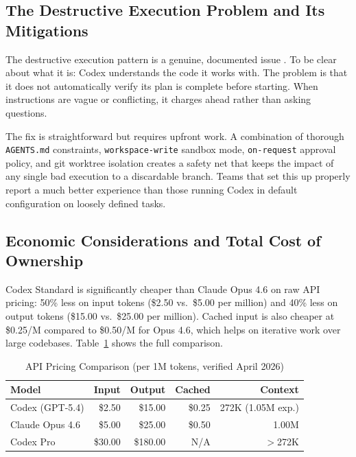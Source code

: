 \documentclass[conference]{IEEEtran}
\begin{document}
\subsection{The Destructive Execution Problem and Its Mitigations}
The destructive execution pattern is a genuine, documented issue \cite{wiegold2026, reddit2026}. To be clear about what it is: Codex understands the code it works with. The problem is that it does not automatically verify its plan is complete before starting. When instructions are vague or conflicting, it charges ahead rather than asking questions.

The fix is straightforward but requires upfront work. A combination of thorough \texttt{AGENTS.md} constraints, \texttt{workspace-write} sandbox mode, \texttt{on-request} approval policy, and git worktree isolation creates a safety net that keeps the impact of any single bad execution to a discardable branch. Teams that set this up properly report a much better experience than those running Codex in default configuration on loosely defined tasks.

\subsection{Economic Considerations and Total Cost of Ownership}
Codex Standard is significantly cheaper than Claude Opus 4.6 on raw API pricing: 50\% less on input tokens (\$2.50 vs.\ \$5.00 per million) and 40\% less on output tokens (\$15.00 vs.\ \$25.00 per million). Cached input is also cheaper at \$0.25/M compared to \$0.50/M for Opus 4.6, which helps on iterative work over large codebases. Table~\ref{tab:pricing} shows the full comparison.

\begin{table}[!htbp]
\caption{API Pricing Comparison (per 1M tokens, verified April 2026)}
\label{tab:pricing}
\centering
\small
\setlength{\tabcolsep}{3pt}
\begin{tabular}{@{}lrrrr@{}}
\toprule
\textbf{Model} & \textbf{Input} & \textbf{Output} & \textbf{Cached} & \textbf{Context} \\
\midrule
Codex (GPT-5.4) & \$2.50 & \$15.00 & \$0.25 & 272K (1.05M exp.) \\
Claude Opus 4.6 & \$5.00 & \$25.00 & \$0.50 & 1.00M \\
Codex Pro & \$30.00 & \$180.00 & N/A & $>$272K \\
\bottomrule
\end{tabular}
\end{table}
\end{document}
